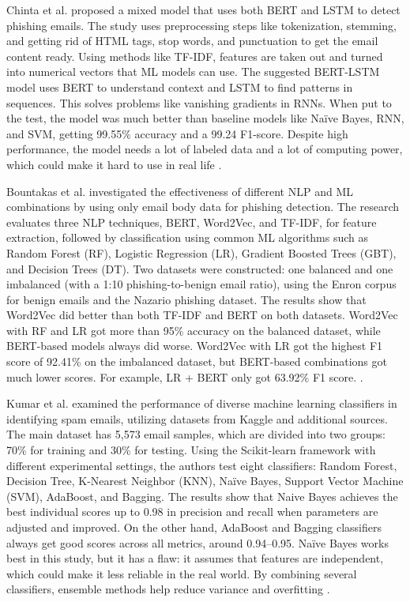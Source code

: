 \documentclass[conference]{IEEEtran}
\begin{document}
Chinta et al. proposed a mixed model that uses both BERT and LSTM to detect phishing emails. The study uses preprocessing steps like tokenization, stemming, and getting rid of HTML tags, stop words, and punctuation to get the email content ready. Using methods like TF-IDF, features are taken out and turned into numerical vectors that ML models can use. The suggested BERT-LSTM model uses BERT to understand context and LSTM to find patterns in sequences. This solves problems like vanishing gradients in RNNs. When put to the test, the model was much better than baseline models like Naïve Bayes, RNN, and SVM, getting 99.55\% accuracy and a 99.24 F1-score. Despite high performance, the model needs a lot of labeled data and a lot of computing power, which could make it hard to use in real life \cite{chinta2025building}.


 Bountakas et al. investigated the effectiveness of different NLP and ML combinations by using only email body data for phishing detection. The research evaluates three NLP techniques, BERT, Word2Vec, and TF-IDF, for feature extraction, followed by classification using common ML algorithms such as Random Forest (RF), Logistic Regression (LR), Gradient Boosted Trees (GBT), and Decision Trees (DT). Two datasets were constructed: one balanced and one imbalanced (with a 1:10 phishing-to-benign email ratio), using the Enron corpus for benign emails and the Nazario phishing dataset.
The results show that Word2Vec did better than both TF-IDF and BERT on both datasets. Word2Vec with RF and LR got more than 95\% accuracy on the balanced dataset, while BERT-based models always did worse. Word2Vec with LR got the highest F1 score of 92.41\% on the imbalanced dataset, but BERT-based combinations got much lower scores. For example, LR + BERT only got 63.92\% F1 score.  \cite{bountakas2021comparison}.


Kumar et al. examined the performance of diverse machine learning classifiers in identifying spam emails, utilizing datasets from Kaggle and additional sources. The main dataset has 5,573 email samples, which are divided into two groups: 70\% for training and 30\% for testing.  Using the Scikit-learn framework with different experimental settings, the authors test eight classifiers: Random Forest, Decision Tree, K-Nearest Neighbor (KNN), Naïve Bayes, Support Vector Machine (SVM), AdaBoost, and Bagging.
The results show that Naive Bayes achieves the best individual scores up to 0.98 in precision and recall when parameters are adjusted and improved. On the other hand, AdaBoost and Bagging classifiers always get good scores across all metrics, around 0.94--0.95. Naïve Bayes works best in this study, but it has a flaw: it assumes that features are independent, which could make it less reliable in the real world. By combining several classifiers, ensemble methods help reduce variance and overfitting \cite{kumar2020email}.
\end{document}
